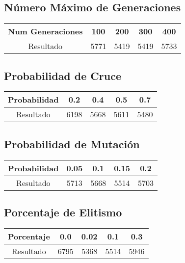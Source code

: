 \documentclass[12pt]{article}
\begin{document}
\subsection{Número Máximo de Generaciones}
\begin{table}[H]
\begin{center}
\begin{tabular}{|ccccc|} \hline
Num Generaciones  & 100 & 200 & 300 & 400 \\  \hline
Resultado  &  5771 & 5419 & 5419 & 5733 \\ \hline
\end{tabular}
\end{center}
\end{table}	

\subsection{Probabilidad de Cruce}
\begin{table}[H]
\begin{center}
\begin{tabular}{|ccccc|} \hline
Probabilidad   & 0.2 & 0.4 & 0.5 & 0.7 \\  \hline
Resultado  &  6198 & 5668 & 5611 & 5480 \\ \hline
\end{tabular}
\end{center}
\end{table}

\subsection{Probabilidad de Mutación}
\begin{table}[H]
\begin{center}
\begin{tabular}{|ccccc|} \hline
Probabilidad   & 0.05 & 0.1 & 0.15 & 0.2 \\  \hline
Resultado  &  5713 & 5668 & 5514 & 5703 \\ \hline
\end{tabular}
\end{center}
\end{table}

\subsection{Porcentaje de Elitismo}
\begin{table}[H]
\begin{center}
\begin{tabular}{|ccccc|} \hline
Porcentaje   & 0.0 & 0.02 & 0.1 & 0.3 \\  \hline
Resultado  &  6795 & 5368 & 5514 & 5946 \\ \hline
\end{tabular}
\end{center}
\end{table}
\end{document}
